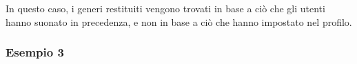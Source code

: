 \documentclass[12pt, a4paper]{article}
\begin{document}
\begin{table}[h]

    
    In questo caso, i generi restituiti vengono trovati in base a ciò che gli utenti hanno suonato in precedenza, e non in base a ciò che hanno impostato nel profilo.
\end{table}

\subsubsection{Esempio 3 }


\end{document}
